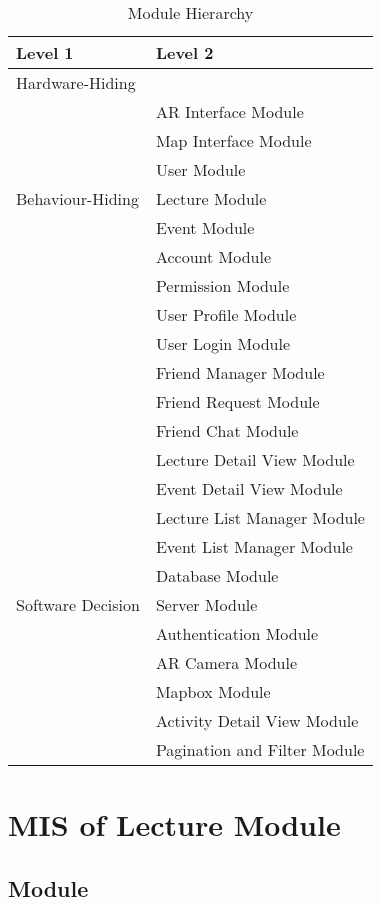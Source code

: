\documentclass[12pt, titlepage]{article}
\begin{document}
\begin{table}[h!]
\centering
\begin{tabular}{p{} p{}}
\toprule
\textbf{Level 1} & \textbf{Level 2}\\
\midrule

{Hardware-Hiding} & ~ \\
\midrule

\multirow{7}{0.3\textwidth}{Behaviour-Hiding}
& AR Interface Module\\
& Map Interface Module\\
& User Module\\
& Lecture Module\\
& Event Module\\
& Account Module\\
& Permission Module\\
& User Profile Module\\
& User Login Module\\
& Friend Manager Module\\ 
& Friend Request Module\\
& Friend Chat Module\\
& Lecture Detail View Module\\
& Event Detail View Module\\
& Lecture List Manager Module\\
& Event List Manager Module\\
\midrule

\multirow{3}{0.3\textwidth}{Software Decision}
& Database Module\\
& Server Module\\
& Authentication Module\\
& AR Camera Module\\
& Mapbox Module\\
& Activity Detail View Module\\
& Pagination and Filter Module\\
\bottomrule

\end{tabular}
\caption{Module Hierarchy}
\label{TblMH}
\end{table}

\newpage

\section{MIS of Lecture Module} \label{mLec}

\subsection{Module}
\end{document}
